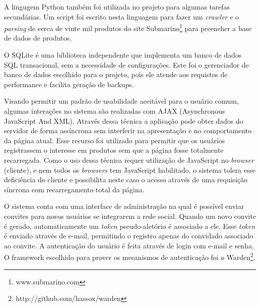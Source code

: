 A lingugem Python também foi utilizada no projeto para algumas tarefas secundárias. Um script foi escrito nesta linguagem para fazer um \emph{crawler} e o \emph{parsing} de cerca de vinte mil produtos do site Submarino\footnote{www.submarino.com} para preencher a base de dados de produtos.

O SQLite é uma biblioteca independente que implementa um banco de dados SQL transacional, sem a necessidade de configurações. Este foi o gerenciador de banco de dados escolhido para o projeto, pois ele atende aos requistos de performance e facilita geração de backups.

Visando permitir um padrão de usabilidade aceitável para o usuário comum, algumas interações no sistema são realizadas com AJAX (Asynchronous JavaScript And XML). Através dessa técnica a aplicação pode obter dados do servidor de forma assíncrona sem interferir na apresentação e no comportamento da página atual. Esse recurso foi utilizado para permitir que os usuários registrassem o interesse em produtos sem que a página fosse totalmente recarregada. Como o uso dessa técnica requer utilização de JavaScript no \emph{browser} (cliente), e nem todos os \emph{browsers} tem JavaScript habilitado, o sistema tolera esse deficiência do cliente e possibilita neste caso o acesso através de uma requisição síncrona com recarregamento total da página.


O sistema conta com uma interface de administração na qual é possível enviar convites para novos usuários se integrarem a rede social. Quando um novo convite é gerado, automaticamente um \emph{token} pseudo-aletório é associado a ele. Esse \emph{token} é enviado através de e-mail, permitindo o registro apenas do convidado associado ao convite. A autenticação do usuário é feita através de login com e-mail e senha. O framework escolhido para prover os mecanismos de autenticação foi o Warden\footnote{http://github.com/hassox/warden}.



